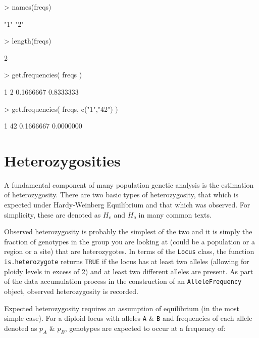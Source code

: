 \documentclass[letterpaper,twoside,openany]{book}
\begin{document}
\begin{Schunk}
\begin{Sinput}
> names(freqs)
\end{Sinput}
\begin{Soutput}
[1] "1" "2"
\end{Soutput}
\begin{Sinput}
> length(freqs)
\end{Sinput}
\begin{Soutput}
[1] 2
\end{Soutput}
\begin{Sinput}
> get.frequencies( freqs ) 
\end{Sinput}
\begin{Soutput}
        1         2 
0.1666667 0.8333333 
\end{Soutput}
\begin{Sinput}
> get.frequencies( freqs, c("1","42") )
\end{Sinput}
\begin{Soutput}
        1        42 
0.1666667 0.0000000 
\end{Soutput}
\end{Schunk}


\section{Heterozygosities}

A fundamental component of many population genetic analysis is the estimation of heterozygosity.  There are two basic types of heterozygosity, that which is expected under Hardy-Weinberg Equilibrium and that which was observed.  For simplicity, these are denoted as $H_{e}$ and $H_{o}$ in many common texts.

Observed heterozygosity is probably the simplest of the two and it is simply the fraction of genotypes in the group you are looking at (could be a population or a region or a site) that are heterozygotes.  In terms of the \texttt{Locus} class, the function \texttt{is.heterozygote} returns \texttt{TRUE} if the locus has at least two alleles (allowing for ploidy levels in excess of 2) and at least two different alleles are present.  As part of the data accumulation process in the construction of an \texttt{AlleleFrequency} object, observed heterozygosity is recorded.

Expected heterozygosity requires an assumption of equilibrium (in the most simple case).  For a diploid locus with alleles \texttt{A} \& \texttt{B} and frequencies of each allele denoted as $p_A$ \& $p_B$, genotypes are expected to occur at a frequency of:
\end{document}
